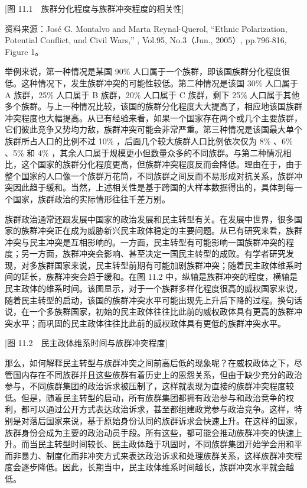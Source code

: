 [图 11.1　族群分化程度与族群冲突程度的相关性]

资料来源：José G. Montalvo and Marta Reynal-Querol, “Ethnic Polarization, Potential Conflict, and Civil Wars,” , Vol.95, No.3（Jun., 2005）, pp.796-816, Figure 1。

举例来说，第一种情况是某国 90\% 人口属于一个族群，即该国族群分化程度很低。这种情况下，发生族群冲突的可能性较低。第二种情况是该国 30\% 人口属于 A 族群，25\% 人口属于 B 族群，20\% 人口属于 C 族群，剩下 25\% 人口属于其他多个族群。与上一种情况比较，该国的族群分化程度大大提高了，相应地该国族群冲突程度也大幅提高。从已有经验来看，如果一个国家存在两个或几个主要族群，它们彼此竞争又势均力敌，族群冲突可能会非常严重。第三种情况是该国最大单个族群所占人口的比例不过 10\% ，后面几个较大族群人口比例依次仅为 8\% 、6\% 、5\% 和 4\% ，其余人口属于规模更小但数量众多的不同族群。与第二种情况相比，这个国家的族群分化程度更高，但族群冲突程度反而会降低。理由在于，由于整个国家的人口像一个族群万花筒，不同族群之间反而不易形成对抗关系，族群冲突因此趋于缓和。当然，上述相关性是基于跨国的大样本数据得出的，具体到每一个国家，族群政治的实际情形往往千差万别。

族群政治通常还跟发展中国家的政治发展和民主转型有关。在发展中世界，很多国家的族群冲突正在成为威胁新兴民主政体稳定的主要问题。从已有研究来看，族群冲突与民主冲突是互相影响的。一方面，民主转型有可能影响一国族群冲突的程度；另一方面，族群冲突会影响、甚至决定一国民主转型的成败。有学者研究发现，对多族群国家来说，民主转型前期有可能加剧族群冲突；随着民主政体维系时间的延长，族群冲突会趋于缓和。在图 11.2 中，纵轴是族群冲突的程度，横轴是民主政体的维系时间。该图显示，对于一个族群多样化程度很高的威权国家来说，随着民主转型的启动，该国的族群冲突水平可能出现先上升后下降的过程。换句话说，在一个多族群国家，初始的民主政体往往比此前的威权政体具有更高的族群冲突水平；而巩固的民主政体往往比此前的威权政体具有更低的族群冲突水平。

[图 11.2　民主政体维系时间与族群冲突程度]

那么，如何解释民主转型与族群冲突之间前高后低的现象呢？在威权政体之下，尽管国内存在不同族群并且这些族群有着历史上的恩怨关系，但由于缺少充分的政治参与，不同族群集团的政治诉求被压制了，这样就表现为直接的族群冲突程度较低。但是，随着民主转型的启动，所有族群集团都拥有政治参与和政治竞争的权利，都可以通过公开方式表达政治诉求，甚至都组建政党参与政治竞争。这样，特别是对落后国家来说，基于原始身份认同的族群诉求会快速上升。在这样的国家，族群身份会成为主要的政治动员手段。所有这些，都可能会推动族群冲突的快速上升。而当民主转型时间较长、民主政体趋于巩固时，不同族群集团开始学会用和平而非暴力、制度化而非冲突方式来表达政治诉求和处理族群关系，这样族群冲突程度会逐步降低。因此，长期当中，民主政体维系时间越长，族群冲突水平就会越低。

